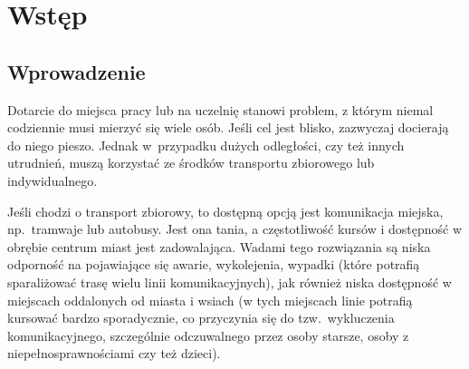 \chapter{Wstęp}
\section{Wprowadzenie}
Dotarcie do miejsca pracy lub na uczelnię stanowi problem, z którym niemal codziennie musi mierzyć się wiele osób. 
Jeśli cel jest blisko, zazwyczaj docierają do niego pieszo. Jednak w~przypadku dużych odległości, czy też innych utrudnień, muszą korzystać ze środków transportu zbiorowego lub indywidualnego.

Jeśli chodzi o transport zbiorowy, to dostępną opcją jest komunikacja miejska, np.\ tramwaje lub autobusy. 
Jest ona tania, a częstotliwość kursów i dostępność w obrębie centrum miast jest zadowalająca. 
Wadami tego rozwiązania są niska odporność na pojawiające się awarie, wykolejenia, wypadki 
(które potrafią sparaliżować trasę wielu linii komunikacyjnych), jak również niska dostępność w miejscach oddalonych od miasta i wsiach 
(w tych miejscach linie potrafią kursować bardzo sporadycznie, co przyczynia się do tzw.\ wykluczenia komunikacyjnego, 
 szczególnie odczuwalnego przez osoby starsze, osoby z niepełnosprawnościami czy też dzieci).


